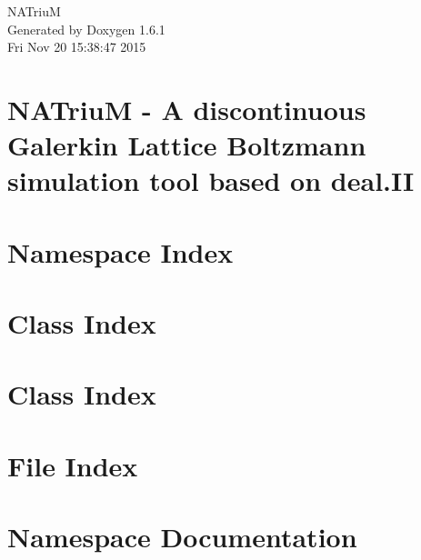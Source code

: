\documentclass[a4paper]{book}
\begin{document}
\hypersetup{pageanchor=false}
\begin{titlepage}
\vspace*{7cm}
\begin{center}
{\Large NATriuM }\\
\vspace*{1cm}
{\large Generated by Doxygen 1.6.1}\\
\vspace*{0.5cm}
{\small Fri Nov 20 15:38:47 2015}\\
\end{center}
\end{titlepage}
\clearemptydoublepage
{}
\tableofcontents
\clearemptydoublepage
{}
\hypersetup{pageanchor=true}
\chapter{NATriuM -\/ A discontinuous Galerkin Lattice Boltzmann simulation tool based on deal.II}
\label{index}\hypertarget{index}{}
\chapter{Namespace Index}

\chapter{Class Index}

\chapter{Class Index}

\chapter{File Index}

\chapter{Namespace Documentation}



\end{document}
